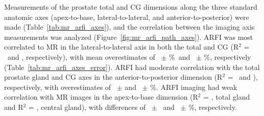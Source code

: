 Measurements of the prostate total and CG dimensions along the three standard
anatomic axes (apex-to-base, lateral-to-lateral, and anterior-to-posterior)
were made (Table~\ref{tab:mr_arfi_axes}), and the correlation between the
imaging axis measurements was analyzed (Figure~\ref{fig:mr_arfi_path_axes}).
ARFI was most correlated to MR in the lateral-to-lateral axis in both the total
and CG (R$^2$ = \totalLatLatRsq~and \centralLatLatRsq, respectively), with mean
overestimates of \ARFImrTotalLatLatMeanPct~$\pm$ \ARFImrTotalLatLatStdPct\%~and
\ARFImrCentralLatLatMeanPct~$\pm$ \ARFImrCentralLatLatStdPct\%, respectively
(Table~\ref{tab:mr_arfi_axes_error}).  ARFI had moderate correlation with the
total prostate gland and CG axes in the anterior-to-posterior dimension (R$^2$
= \totalAntPostRsq~and \centralAntPostRsq), respectively, with overestimates of
\ARFImrTotalAntPostMeanPct~$\pm$ \ARFImrTotalAntPostStdPct and
\ARFImrCentralAntPostMeanPct~$\pm$ \ARFImrCentralAntPostStdPct\%.  ARFI imaging
had weak correlation with MR images in the apex-to-base dimension (R$^2$ =
\totalApexBaseRsq, total gland and R$^2$ = \centralApexBaseRsq, central gland),
with differences of \ARFImrTotalApexBaseMeanPct~$\pm$
\ARFImrTotalApexBaseStdPct~and \ARFImrCentralApexBaseMeanPct~$\pm$
\ARFImrCentralApexBaseStdPct\%, respectively.





%

%

%
